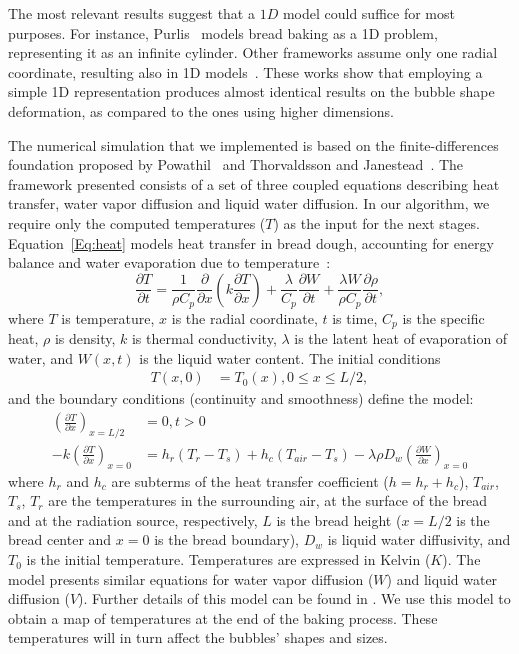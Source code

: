 The most relevant results suggest that a $1D$ model could suffice for most purposes. 
For instance, Purlis~\cite{Purlis2011} models bread baking as a 1D problem, representing it as an infinite cylinder.
Other frameworks assume only one radial coordinate, resulting also in 1D models~\cite{Powathil2004, Thorvaldsson1999}.  
These works show that employing a simple 1D representation produces almost identical results on the  bubble shape deformation, as compared to the ones using higher dimensions. 

The numerical simulation that we implemented is based on the finite-differences foundation proposed by Powathil~\cite{Powathil2004} and Thorvaldsson and Janestead~\cite{Thorvaldsson1999}. 
The framework presented consists of a set of three coupled equations describing heat transfer, water vapor diffusion and liquid water diffusion.
In our algorithm, we require only the computed temperatures ($T$) as the input for the next stages.
Equation~\ref{Eq:heat} models heat transfer in bread dough, accounting for energy balance and water evaporation due to temperature~\cite{Thorvaldsson1999}:
%
\begin{equation}
\label{Eq:heat}
\frac{\partial T}{\partial t} = \frac{1}{\rho C_{p}} \frac{\partial}{\partial x} \left ( k \frac{\partial T}{\partial x} \right ) + \frac{\lambda}{C_{p}} \frac{\partial W}{\partial t}+\frac{\lambda W}{ \rho C_{p} }\frac{\partial \rho}{\partial t},
\end{equation}
%
where $T$ is temperature, $x$ is the radial coordinate, $t$ is time, $C_{p}$ is the specific heat, $\rho$ is density, $k$ is thermal conductivity, $\lambda$ is the latent heat of evaporation of water, and $W(x,t)$ is the liquid water content. 
The initial conditions
%
\begin{align*}
T(x,0) &= T_{0}(x), 0\le x \le L/2,
\end{align*}
and the boundary conditions (continuity and smoothness) define the model:
\begin{align*}
\left ( \frac{\partial T}{\partial x} \right )_{x=L/2} &= 0 , t > 0 \\
-k \left ( \frac{\partial T}{\partial x} \right )_{x=0} &= h_{r}(T_{r}-T_{s}) + h_{c}(T_{air}-T_{s}) - \lambda \rho D_{w} \left (\frac{\partial W}{\partial x} \right )_{x=0}
\end{align*}
%
where $h_{r}$ and $h_{c}$ are subterms of the heat transfer coefficient ($h = h_{r}+h_{c}$), $T_{air}$, $T_{s}$, $T_{r}$ are the temperatures in the surrounding air, at the surface of the bread and at the radiation source, respectively, $L$ is the bread height ($x = L/2$ is the bread center and $x = 0$ is the bread boundary), $D_{w}$ is liquid water diffusivity, and $T_{0}$ is the initial temperature. 
Temperatures are expressed in Kelvin ($K$). 
The model presents similar equations for water vapor diffusion ($W$) and  liquid water diffusion ($V$). 
Further details of this model can be found in \cite{Thorvaldsson1999}.
We use this model to obtain a map of temperatures at the end of the baking process. 
These temperatures will in turn affect the bubbles' shapes and sizes.

